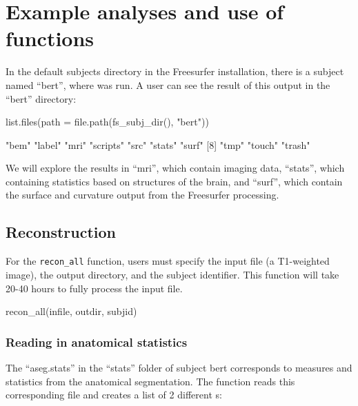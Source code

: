 \section{Example analyses and use of
functions}\label{example-analyses-and-use-of-functions}

In the default subjects directory in the Freesurfer installation, there
is a subject named ``bert'', where  was run. A user can
see the result of this output in the ``bert'' directory:

\begin{Schunk}
\begin{Sinput}
list.files(path  = file.path(fs_subj_dir(), "bert"))
\end{Sinput}
\begin{Soutput}
 [1] "bem"     "label"   "mri"     "scripts" "src"     "stats"   "surf"   
 [8] "tmp"     "touch"   "trash"  
\end{Soutput}
\end{Schunk}

We will explore the results in ``mri'', which contain imaging data,
``stats'', which containing statistics based on structures of the brain,
and ``surf'', which contain the surface and curvature output from the
Freesurfer processing.

\subsection{Reconstruction}\label{reconstruction}

For the \texttt{recon\_all} function, users must specify the input file
(a T1-weighted image), the output directory, and the subject identifier.
This function will take 20-40 hours to fully process the input file.

\begin{Schunk}
\begin{Sinput}
recon_all(infile, outdir, subjid)
\end{Sinput}
\end{Schunk}

\subsubsection{Reading in anatomical
statistics}\label{reading-in-anatomical-statistics}

The ``aseg.stats'' in the ``stats'' folder of subject bert corresponds
to measures and statistics from the anatomical segmentation. The
 function reads this corresponding file and
creates a list of 2 different s:

